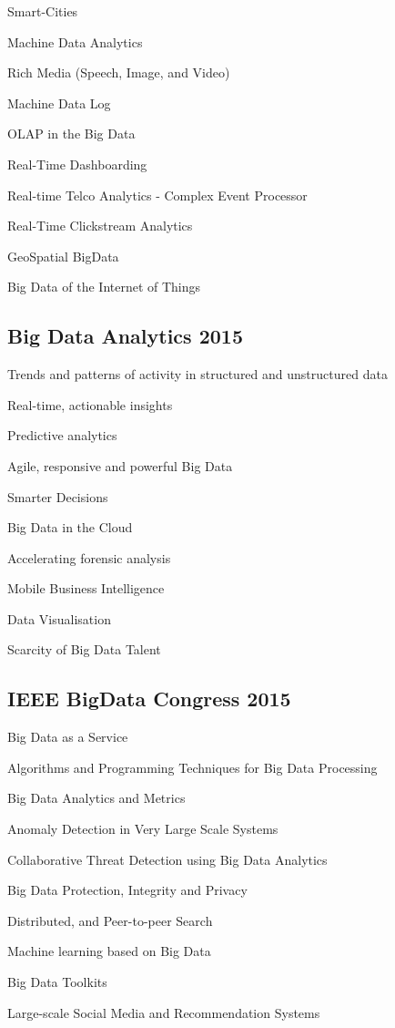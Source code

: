 \documentclass{report}
\begin{document}
Smart-Cities

Machine Data Analytics

Rich Media (Speech, Image, and Video)

Machine Data Log

OLAP in the Big Data 

Real-Time Dashboarding

Real-time Telco Analytics - Complex Event Processor

Real-Time Clickstream Analytics

GeoSpatial BigData

Big Data of the Internet of Things 

\subsection{Big Data Analytics 2015}
Trends and patterns of activity in structured and unstructured data

Real-time, actionable insights

Predictive analytics

Agile, responsive and powerful Big Data

Smarter Decisions

Big Data in the Cloud

Accelerating forensic analysis

Mobile Business Intelligence

Data Visualisation

Scarcity of Big Data Talent

\subsection{IEEE BigData Congress 2015}

Big Data as a Service

Algorithms and Programming Techniques for Big Data Processing

Big Data Analytics and Metrics

Anomaly Detection in Very Large Scale Systems

Collaborative Threat Detection using Big Data Analytics

Big Data Protection, Integrity and Privacy

Distributed, and Peer-to-peer Search

Machine learning based on Big Data

Big Data Toolkits

Large-scale Social Media and Recommendation Systems
\end{document}
